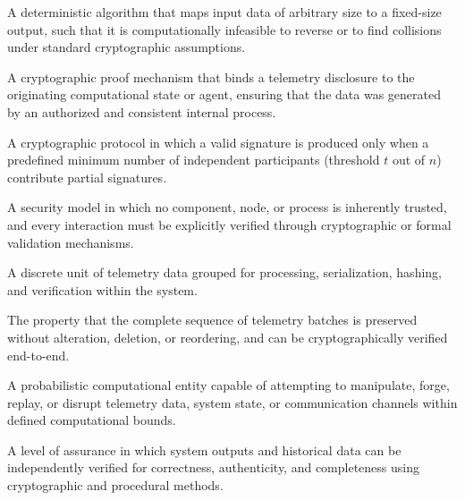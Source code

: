 \begin{definition}
A deterministic algorithm that maps input data of arbitrary size to a fixed-size output, such that it is computationally infeasible to reverse or to find collisions under standard cryptographic assumptions.
\end{definition}

\begin{definition}
A cryptographic proof mechanism that binds a telemetry disclosure to the originating computational state or agent, ensuring that the data was generated by an authorized and consistent internal process.
\end{definition}

\begin{definition}
A cryptographic protocol in which a valid signature is produced only when a predefined minimum number of independent participants (threshold $t$ out of $n$) contribute partial signatures.
\end{definition}

\begin{definition}
A security model in which no component, node, or process is inherently trusted, and every interaction must be explicitly verified through cryptographic or formal validation mechanisms.
\end{definition}

\begin{definition}
A discrete unit of telemetry data grouped for processing, serialization, hashing, and verification within the system.
\end{definition}

\begin{definition}
The property that the complete sequence of telemetry batches is preserved without alteration, deletion, or reordering, and can be cryptographically verified end-to-end.
\end{definition}

\begin{definition}[Adversary]
A probabilistic computational entity capable of attempting to manipulate, forge, replay, or disrupt telemetry data, system state, or communication channels within defined computational bounds.
\end{definition}

\begin{definition}
A level of assurance in which system outputs and historical data can be independently verified for correctness, authenticity, and completeness using cryptographic and procedural methods.
\end{definition}

